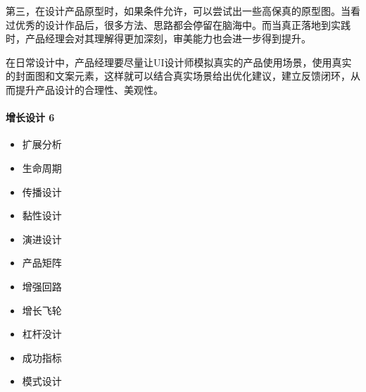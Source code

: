 \documentclass[letterpaper,10pt,english]{sphinxmanual}
\begin{document}
第三，在设计产品原型时，如果条件允许，可以尝试出一些高保真的原型图。当看过优秀的设计作品后，很多方法、思路都会停留在脑海中。而当真正落地到实践时，产品经理会对其理解得更加深刻，审美能力也会进一步得到提升。

在日常设计中，产品经理要尽量让UI设计师模拟真实的产品使用场景，使用真实的封面图和文案元素，这样就可以结合真实场景给出优化建议，建立反馈闭环，从而提升产品设计的合理性、美观性。


\paragraph{增长设计 6\sphinxfootnotemark[459]}
\label{\detokenize{chapter_idea/design:id16}}\label{\detokenize{chapter_idea/design:id17}}%
\begin{footnotetext}[459]\sphinxAtStartFootnote
{}
%
\end{footnotetext}\ignorespaces \begin{itemize}
\item {} 
扩展分析

\item {} 
生命周期

\item {} 
传播设计

\item {} 
黏性设计

\item {} 
演进设计

\item {} 
产品矩阵

\item {} 
增强回路

\item {} 
增长飞轮

\item {} 
杠杆没计

\item {} 
成功指标

\item {} 
模式设计

\end{itemize}
\end{document}

